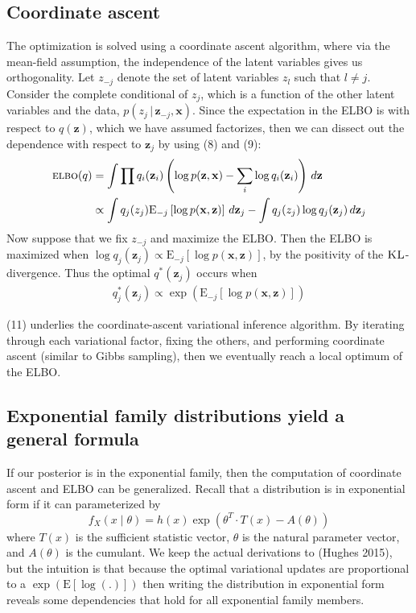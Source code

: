 \documentclass[11pt]{article}
\newcommand{\bx}{\ensuremath{\mathbf{x}}}
\newcommand{\bz}{\ensuremath{\mathbf{z}}}
\newcommand{\g}{\,\vert\,}
\newcommand{\ELBO}{\textsc{elbo}}
\newcommand{\E}{\mathrm{E}}
\begin{document}
\subsection{Coordinate ascent}
The optimization is solved using a coordinate ascent algorithm, where via the mean-field assumption, the independence of the latent variables gives us orthogonality. Let $z_{-j}$ denote the set of latent variables $z_l$ such that $l \neq j$. Consider the complete conditional of $z_j$, which is a function of the other latent variables and the data, $p(z_j \g \bz_{-j}, \bx)$. Since the expectation in the \textsc{ELBO} is with respect to $q(\bz)$, which we have assumed factorizes, then we can dissect out the dependence with respect to $\bz_j$ by using (8) and (9):
\begin{align}
\ELBO(q) &= \int \prod q_i(\bz_i) \left(\log p(\bz, \bx) - \sum_i \log q_i(\bz_i) \right) \,d\bz \nonumber \\
			&\propto \int q_j(z_j) \E_{-j}\left[\log p(\bx, \bz) \right] \, d\bz_j - \int q_j(z_j) \log q_j(\bz_j) \, d\bz_j
\end{align}
Now suppose that we fix $z_{-j}$ and maximize the \textsc{ELBO}. Then the \textsc{ELBO} is maximized when $\log q_j(\bz_j) \propto \E_{-j}\left[\log p(\bx, \bz) \right]$, by the positivity of the $\textsc{KL}$-divergence. Thus the optimal $q^*(\bz_j)$ occurs when
\begin{align}
q^*_j(\bz_j) \propto \exp\left(\E_{-j}\left[\log p(\bx, \bz) \right]\right)
\end{align}

(11) underlies the coordinate-ascent variational inference algorithm. By iterating through each variational factor, fixing the others, and performing coordinate ascent (similar to Gibbs sampling), then we eventually reach a local optimum of the \textsc{ELBO}.

\subsection{Exponential family distributions yield a general formula}

If our posterior is in the exponential family, then the computation of coordinate ascent and ELBO can be generalized. Recall that a distribution is in exponential form if it can parameterized by $$f_X(x\mid\theta) = h(x) \exp \left (\theta^T \cdot T(x) -A(\theta)\right )$$
where $T(x)$ is the sufficient statistic vector, $\theta$ is the natural parameter vector, and $A(\theta)$ is the cumulant. We keep the actual derivations to (Hughes 2015), but the intuition is that because the optimal variational updates are proportional to a $\exp(\E[\log(.)])$ then writing the distribution in exponential form reveals some dependencies that hold for all exponential family members.
\end{document}
